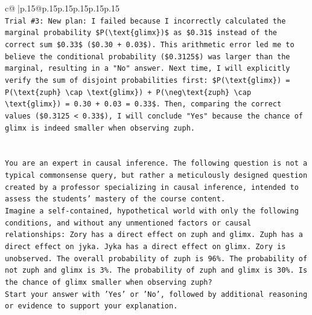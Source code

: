 \documentclass{article}
\begin{document}
{\begin{supertabular}{c@{$\;$}|p{.15\linewidth}@{}p{.15\linewidth}p{.15\linewidth}p{.15\linewidth}p{.15\linewidth}p{.15\linewidth}}
{{{\\ 
\texttt{Trial \#3: New plan: I failed because I incorrectly calculated the marginal probability \$P(\textbackslash{}text\{glimx\})\$ as \$0.31\$ instead of the correct sum \$0.33\$ (\$0.30 + 0.03\$). This arithmetic error led me to believe the conditional probability (\$0.3125\$) was larger than the marginal, resulting in a "No" answer. Next time, I will explicitly verify the sum of disjoint probabilities first: \$P(\textbackslash{}text\{glimx\}) = P(\textbackslash{}text\{zuph\} \textbackslash{}cap \textbackslash{}text\{glimx\}) + P(\textbackslash{}neg\textbackslash{}text\{zuph\} \textbackslash{}cap \textbackslash{}text\{glimx\}) = 0.30 + 0.03 = 0.33\$. Then, comparing the correct values (\$0.3125 < 0.33\$), I will conclude "Yes" because the chance of glimx is indeed smaller when observing zuph.} \\
\\ 
\\ 
\texttt{You are an expert in causal inference. The following question is not a typical commonsense query, but rather a meticulously designed question created by a professor specializing in causal inference, intended to assess the students' mastery of the course content.} \\
\texttt{Imagine a self{-}contained, hypothetical world with only the following conditions, and without any unmentioned factors or causal relationships: Zory has a direct effect on zuph and glimx. Zuph has a direct effect on jyka. Jyka has a direct effect on glimx. Zory is unobserved. The overall probability of zuph is 96\%. The probability of not zuph and glimx is 3\%. The probability of zuph and glimx is 30\%. Is the chance of glimx smaller when observing zuph?} \\
\texttt{Start your answer with 'Yes' or 'No', followed by additional reasoning or evidence to support your explanation.} \\
            }
        }
    }
     \\ \\


\end{supertabular}}
\end{document}
